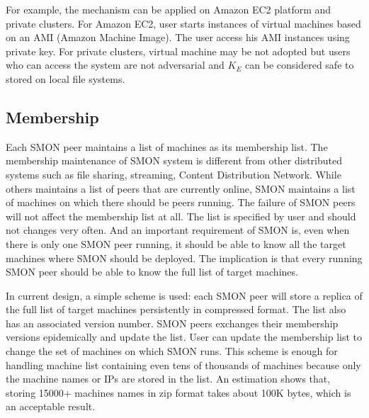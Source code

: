 For example, the mechanism can be applied on Amazon EC2
platform and private clusters. For Amazon EC2, user starts
instances of virtual machines based on an AMI (Amazon
Machine Image). The user access his AMI instances using
private key. For private clusters, virtual machine may be not
adopted but users who can access the system are not
adversarial and $K_E$ can be considered safe to stored on
local file systems.

\subsection{Membership}

Each SMON peer maintains a list of machines as its
membership list.  The membership maintenance of SMON system
is different from other distributed systems such as file
sharing, streaming, Content Distribution Network. While
others maintains a list of peers that are currently online,
SMON maintains a list of machines on which there should be
peers running. The failure of SMON peers will not affect the
membership list at all.  The list is specified by user and
should not changes very often. And an important requirement
of SMON is, even when there is only one SMON peer running,
it should be able to know all the target machines where SMON
should be deployed.  The implication is that every running
SMON peer should be able to know the full list of target
machines.

In current design, a simple scheme is used: each SMON peer
will store a replica of the full list of target machines
persistently in compressed format. The list also has an
associated version number. SMON peers exchanges their
membership versions epidemically and update the list. User
can update the membership list to change the set of machines
on which SMON runs.
This scheme is enough for handling machine list containing
even tens of thousands of machines because only the machine
names or IPs are stored in the list.  An estimation shows
that, storing 15000+ machines names in zip format takes
about 100K bytes, which is an acceptable result.



